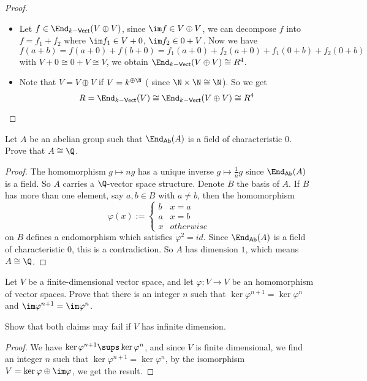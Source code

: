 \begin{proof}
\mbox{}
\begin{itemize}
\item Let $f\in \End_{k-\mathsf{Vect}}(V\oplus V)$, since $\im f\in V\oplus V$, we can decompose $f$ into $f=f_1+f_2$ where $\im f_1\in V+0$, $\im f_2\in 0+V$. Now we have
\[f(a+b)=f(a+0)+f(b+0)=f_1(a+0)+f_2(a+0)+f_1(0+b)+f_2(0+b)\]
with $V+0\cong 0+V\cong V$, we obtain $\End_{k-\mathsf{Vect}}(V\oplus V)\cong R^4$.
\item Note that $V=V\oplus V$ if $V=k^{\oplus\N}$ ( since $\N\times\N\cong\N$). So we get 
\[R=\End_{k-\mathsf{Vect}}(V)\cong\End_{k-\mathsf{Vect}}(V\oplus V)\cong R^4\] 
\end{itemize}
\end{proof}
\begin{exercise}
Let $A$ be an abelian group such that $\End_{\mathsf{Ab}}(A)$ is a field of characteristic $0$. Prove that $A\cong\Q$.
\end{exercise}
\begin{proof}
The homomorphism $g\mapsto ng$ has a unique inverse $g\mapsto \frac{1}{n}g$ since $\End_{\mathsf{Ab}}(A)$ is a field. So $A$ carries a $\Q$-vector space structure. Denote $B$ the basis of $A$. If $B$ has more than one element, say $a,b\in B$ with $a\neq b$, then the homomorphism
\[\varphi(x):=\begin{cases}
b &x=a\\
a &x=b\\
x &otherwise
\end{cases}\]
on $B$ defines a endomorphism which satisfies $\varphi^2=id$. Since $\End_{\mathsf{Ab}}(A)$ is a field of characteristic $0$, this is a contradiction. So $A$ has dimension $1$, which means $A\cong\Q$.
\end{proof}
\begin{exercise}\label{Kn=Kn+1}
Let $V$ be a finite-dimensional vector space, and let $\varphi:V\to V$ be an homomorphism of vector spaces. Prove that there is an integer $n$ such that $\ker\varphi^{n+1}=\ker\varphi^n$ and $\im\varphi^{n+1}=\im\varphi^n$.\par
Show that both claims may fail if $V$ has infinite dimension.
\end{exercise}
\begin{proof}
We have $\ker\varphi^{n+1}\sups\ker\varphi^n$, and since $V$ is finite dimensional, we find an integer $n$ such that $\ker\varphi^{n+1}=\ker\varphi^n$, by the isomorphism $V=\ker\varphi\oplus\im\varphi$, we get the result.
\end{proof}
